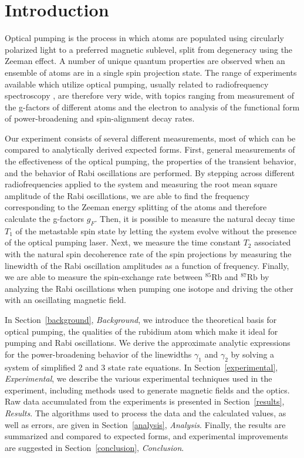 
\section{Introduction}\label{introduction}

Optical pumping is the process in which atoms are populated using circularly polarized light to a preferred magnetic sublevel, split from degeneracy using the Zeeman effect. A number of unique quantum properties are observed when an ensemble of atoms are in a single spin projection state. The range of experiments available which utilize optical pumping, usually related to radiofrequency spectroscopy \cite{bloom}, are therefore very wide, with topics ranging from measurement of the g-factors of different atoms and the electron to analysis of the functional form of power-broadening and spin-alignment decay rates.

Our experiment consists of several different measurements, most of which can be compared to analytically derived expected forms. First, general measurements of the effectiveness of the optical pumping, the properties of the transient behavior, and the behavior of Rabi oscillations are performed. By stepping across different radiofrequencies applied to the system and measuring the root mean square amplitude of the Rabi oscillations, we are able to find the frequency corresponding to the Zeeman energy splitting of the atoms and therefore calculate the g-factors $g_{F}$. Then, it is possible to measure the natural decay time $T_{1}$ of the metastable spin state by letting the system evolve without the presence of the optical pumping laser. Next, we measure the time constant $T_{2}$ associated with the natural spin decoherence rate of the spin projections by measuring the linewidth of the Rabi oscillation amplitudes as a function of frequency. Finally, we are able to measure the spin-exchange rate between $^{85}$Rb and $^{87}$Rb by analyzing the Rabi oscillations when pumping one isotope and driving the other with an oscillating magnetic field.

In Section~\ref{background}, \emph{Background}, we introduce the theoretical basis for optical pumping, the qualities of the rubidium atom which make it ideal for pumping and Rabi oscillations. We derive the approximate analytic expressions for the power-broadening behavior of the linewidths $\gamma_{1}$ and $\gamma_{2}$ by solving a system of simplified 2 and 3 state rate equations. In Section~\ref{experimental}, \emph{Experimental}, we describe the various experimental techniques used in the experiment, including methods used to generate magnetic fields and the optics. Raw data accumulated from the experiments is presented in Section~\ref{results}, \emph{Results}. The algorithms used to process the data and the calculated values, as well as errors, are given in Section~\ref{analysis}, \emph{Analysis}. Finally, the results are summarized and compared to expected forms, and experimental improvements are suggested in Section~\ref{conclusion}, \emph{Conclusion}.
